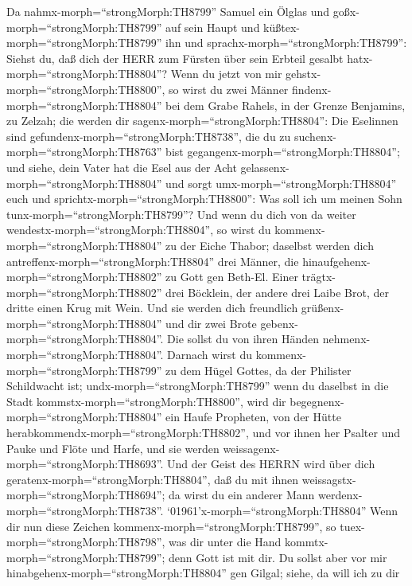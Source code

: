  Da nahmx-morph=``strongMorph:TH8799'' Samuel ein Ölglas und
goßx-morph=``strongMorph:TH8799'' auf sein Haupt und
küßtex-morph=``strongMorph:TH8799'' ihn und
sprachx-morph=``strongMorph:TH8799'': Siehst du, daß dich der HERR zum
Fürsten über sein Erbteil gesalbt hatx-morph=``strongMorph:TH8804''?
 Wenn du jetzt von mir gehstx-morph=``strongMorph:TH8800'',
so wirst du zwei Männer findenx-morph=``strongMorph:TH8804'' bei dem
Grabe Rahels, in der Grenze Benjamins, zu Zelzah; die werden dir
sagenx-morph=``strongMorph:TH8804'': Die Eselinnen sind
gefundenx-morph=``strongMorph:TH8738'', die du zu
suchenx-morph=``strongMorph:TH8763'' bist
gegangenx-morph=``strongMorph:TH8804''; und siehe, dein Vater hat die
Esel aus der Acht gelassenx-morph=``strongMorph:TH8804'' und sorgt
umx-morph=``strongMorph:TH8804'' euch und
sprichtx-morph=``strongMorph:TH8800'': Was soll ich um meinen Sohn
tunx-morph=``strongMorph:TH8799''?  Und wenn du dich von da
weiter wendestx-morph=``strongMorph:TH8804'', so wirst du
kommenx-morph=``strongMorph:TH8804'' zu der Eiche Thabor; daselbst
werden dich antreffenx-morph=``strongMorph:TH8804'' drei Männer, die
hinaufgehenx-morph=``strongMorph:TH8802'' zu Gott gen Beth-El. Einer
trägtx-morph=``strongMorph:TH8802'' drei Böcklein, der andere drei Laibe
Brot, der dritte einen Krug mit Wein.  Und sie werden dich
freundlich grüßenx-morph=``strongMorph:TH8804'' und dir zwei Brote
gebenx-morph=``strongMorph:TH8804''. Die sollst du von ihren Händen
nehmenx-morph=``strongMorph:TH8804''.  Darnach wirst du
kommenx-morph=``strongMorph:TH8799'' zu dem Hügel Gottes, da der
Philister Schildwacht ist; undx-morph=``strongMorph:TH8799'' wenn du
daselbst in die Stadt kommstx-morph=``strongMorph:TH8800'', wird dir
begegnenx-morph=``strongMorph:TH8804'' ein Haufe Propheten, von der
Hütte herabkommendx-morph=``strongMorph:TH8802'', und vor ihnen her
Psalter und Pauke und Flöte und Harfe, und sie werden
weissagenx-morph=``strongMorph:TH8693''.  Und der Geist des
HERRN wird über dich geratenx-morph=``strongMorph:TH8804'', daß du mit
ihnen weissagstx-morph=``strongMorph:TH8694''; da wirst du ein anderer
Mann werdenx-morph=``strongMorph:TH8738''. 
`01961'\textbar x-morph=``strongMorph:TH8804'' Wenn dir nun diese
Zeichen kommenx-morph=``strongMorph:TH8799'', so
tuex-morph=``strongMorph:TH8798'', was dir unter die Hand
kommtx-morph=``strongMorph:TH8799''; denn Gott ist mit dir. 
Du sollst aber vor mir hinabgehenx-morph=``strongMorph:TH8804'' gen
Gilgal; siehe, da will ich zu dir
